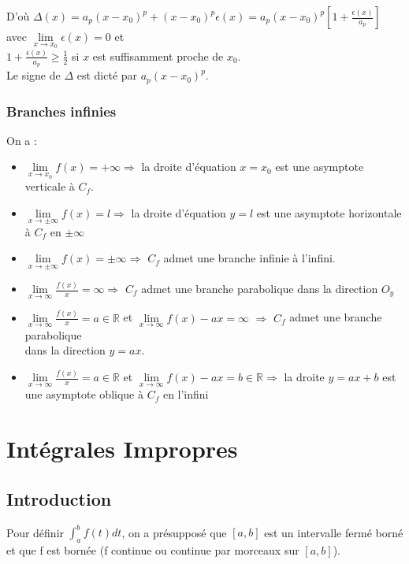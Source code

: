 \documentclass[a4paper,10pt]{book} %
\newcommand{\R}{\mathbb{R}}
\begin{document}
D'où $\Delta(x)=a_p(x-x_0)^p+(x-x_0)^p\epsilon(x)=a_p(x-x_0)^p\left[1+\frac{\epsilon(x)}{a_p}\right]$ avec $\lim\limits_{x\rightarrow x_0}\epsilon(x)=0$ et\\
$1+\frac{\epsilon(x)}{a_p}\geq \frac{1}{2}$ si $x$ est suffisamment proche de $x_0$.\\

Le signe de $\Delta$ est dicté par $a_p(x-x_0)^p$.

\subsection{Branches infinies}
On a :
\begin{itemize}
\item $\lim\limits_{x\rightarrow x_0}f(x)=+\infty \Rightarrow$ la droite d'équation $x=x_0$ est une asymptote verticale à $C_f$.

\item $\lim\limits_{x\rightarrow \pm \infty}f(x)=l\Rightarrow$ la droite d'équation $y=l$ est une asymptote horizontale à $C_f$ en $\pm\infty$

\item $\lim\limits_{x\rightarrow \pm\infty}f(x)=\pm\infty\Rightarrow$ $C_f$ admet une branche infinie à l'infini.

\item $\lim\limits_{x\rightarrow \infty}\frac{f(x)}{x}=\infty\Rightarrow$ $C_f$ admet une branche parabolique dans la direction $O_y$

\item $\lim\limits_{x\rightarrow \infty}\frac{f(x)}{x}=a\in \R$ et $\lim\limits_{x\rightarrow \infty} f(x)-ax=\infty$ $\Rightarrow$ $C_f$ admet une branche parabolique\\
dans la direction $y=ax$.

\item $\lim\limits_{x\rightarrow \infty}\frac{f(x)}{x}=a\in \R$ et $\lim\limits_{x\rightarrow \infty} f(x)-ax=b\in \R\Rightarrow$ la droite $y=ax+b$ est une asymptote oblique à $C_f$ en l'infini
\end{itemize}




\chapter{Intégrales Impropres}
\section*{Introduction}
Pour définir $\displaystyle \int_a^bf(t)dt$, on a présupposé que $[a,b]$ est un intervalle fermé borné et que f est bornée (f continue ou continue par morceaux sur $[a,b]$).\\
\end{document}
